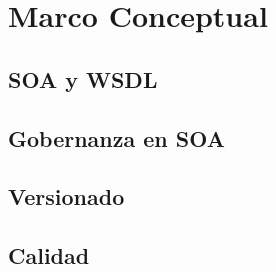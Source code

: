 \chapter{Marco Conceptual}
\label{capitulo2}

\section{SOA y WSDL}
\label{capitulo2:SOA_WSDL}

\section{Gobernanza en SOA}
\label{capitulo2:gobernanza_SOA}

\section{Versionado}
\label{capitulo2:versionado}

\section{Calidad}
\label{capitulo2:calidad}

